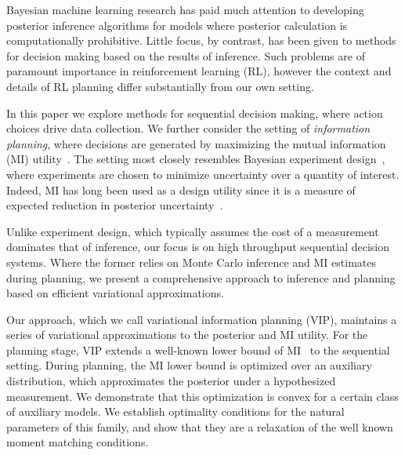 Bayesian machine learning research has paid much attention to
developing posterior inference algorithms for models where posterior
calculation is computationally prohibitive.  Little focus, by
contrast, has been given to methods for decision making based on the
results of inference.  Such problems are of paramount importance in
reinforcement learning (RL), however the context and details of RL
planning differ substantially from our own setting.

In this paper we explore methods for sequential decision making, where
action choices drive data collection.  We further consider the setting
of \emph{information planning}, where decisions are generated by
maximizing the mutual information (MI) utility~\citep{WilliamsThesis}.
The setting most closely resembles Bayesian experiment
design~\citep{lindley56}, where experiments are chosen to minimize
uncertainty over a quantity of interest.  Indeed, MI has long been
used as a design utility since it is a measure of expected reduction
in posterior uncertainty~\citep{blackwell50, bernardo79a}.

Unlike experiment design, which typically assumes the cost of a
measurement dominates that of inference, our focus is on high
throughput sequential decision systems.  Where the former relies on
Monte Carlo inference and MI estimates during planning, we present a
comprehensive approach to inference and planning based on efficient
variational approximations.  

Our approach, which we call variational information planning (VIP),
maintains a series of variational approximations to the posterior and
MI utility.  For the planning stage, VIP extends a well-known lower
bound of MI~\citep{agakov2004algorithm} to the sequential setting.
During planning, the MI lower bound is optimized over an auxiliary
distribution, which approximates the posterior under a hypothesized
measurement.  We demonstrate that this optimization is convex for a
certain class of auxiliary models.  We establish optimality conditions
for the natural parameters of this family, and show that they are a
relaxation of the well known moment matching conditions.


